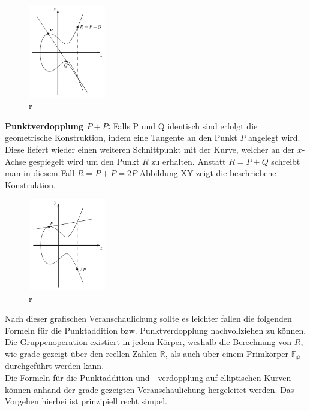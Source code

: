 \begin{figure}[H]
    \centering
    \includegraphics[width=0.3\textwidth]{grafiken/Punktaddition.PNG}
    \caption[Punktaddition]{r}
    \label{fig:Punktaddition}
\end{figure}

\textbf{Punktverdopplung $P + P$:}
Falls P und Q identisch sind erfolgt die geometrische Konstruktion, indem eine Tangente an den Punkt $P$ angelegt wird. Diese liefert wieder einen weiteren Schnittpunkt mit der Kurve, welcher an der $x$-Achse gespiegelt wird um den Punkt $R$ zu erhalten. Anstatt $R = P + Q$ schreibt man in diesem Fall $R = P + P = 2P$   Abbildung XY zeigt die beschriebene Konstruktion. 

\begin{figure}[H]
    \centering
    \includegraphics[width=0.3\textwidth]{grafiken/Punktverdopplung.PNG}
    \caption[Punktverdopplung]{r}
    \label{fig:Punktverdopplung}
\end{figure}

Nach dieser grafischen Veranschaulichung sollte es leichter fallen die folgenden Formeln für die Punktaddition bzw. Punktverdopplung nachvollziehen zu können. Die Gruppenoperation existiert in jedem Körper, weshalb die Berechnung von $R$, wie grade gezeigt über den reellen Zahlen $\mathbb{R}$, als auch über einem Primkörper $\mathbb{F_p}$ durchgeführt werden kann.\\

Die Formeln für die Punktaddition und - verdopplung auf elliptischen Kurven können anhand der grade gezeigten Veranschaulichung hergeleitet werden. Das Vorgehen hierbei ist prinzipiell recht simpel.\\ 

